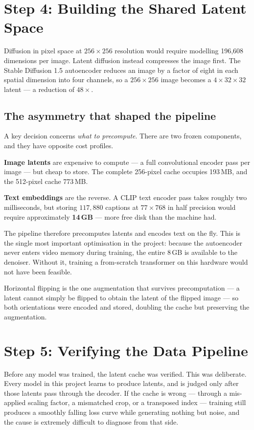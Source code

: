 \documentclass[11pt,a4paper]{article}
\newcommand{\step}[1]{\section{#1}}
\begin{document}
\step{Step 4: Building the Shared Latent Space}

Diffusion in pixel space at $256\times256$ resolution would require modelling
196{,}608 dimensions per image. Latent diffusion instead compresses the image
first. The Stable Diffusion 1.5 autoencoder reduces an image by a factor of
eight in each spatial dimension into four channels, so a $256\times256$ image
becomes a $4\times32\times32$ latent --- a reduction of $48\times$.

\subsection{The asymmetry that shaped the pipeline}

A key decision concerns \emph{what to precompute}. There are two frozen
components, and they have opposite cost profiles.

\textbf{Image latents} are expensive to compute --- a full convolutional
encoder pass per image --- but cheap to store. The complete 256-pixel cache
occupies 193\,MB, and the 512-pixel cache 773\,MB.

\textbf{Text embeddings} are the reverse. A CLIP text encoder pass takes roughly
two milliseconds, but storing $117{,}880$ captions at $77\times768$ in half
precision would require approximately \textbf{14\,GB} --- more free disk than the
machine had.

The pipeline therefore precomputes latents and encodes text on the fly. This is
the single most important optimisation in the project: because the autoencoder
never enters video memory during training, the entire 8\,GB is available to the
denoiser. Without it, training a from-scratch transformer on this hardware would
not have been feasible.

Horizontal flipping is the one augmentation that survives precomputation --- a
latent cannot simply be flipped to obtain the latent of the flipped image --- so
both orientations were encoded and stored, doubling the cache but preserving the
augmentation.

\step{Step 5: Verifying the Data Pipeline}
\label{sec:verify}

Before any model was trained, the latent cache was verified. This was
deliberate. Every model in this project learns to produce latents, and is judged
only after those latents pass through the decoder. If the cache is wrong ---
through a mis-applied scaling factor, a mismatched crop, or a transposed index
--- training still produces a smoothly falling loss curve while generating
nothing but noise, and the cause is extremely difficult to diagnose from that
side.
\end{document}

